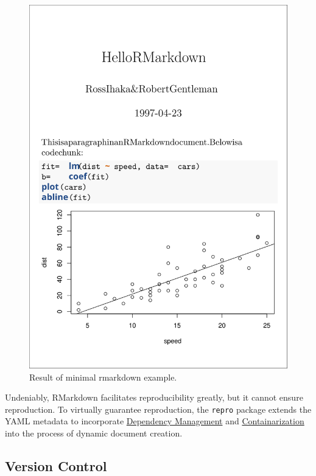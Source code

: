 \documentclass[12pt,a4paper,]{article}
\begin{document}
\begin{figure}

{\centering \includegraphics[width=1\linewidth]{images/rmarkdown} 

}

\caption{Result of minimal rmarkdown example.}\label{fig:rmarkdown}
\end{figure}

Undeniably, RMarkdown facilitates reproducibility greatly, but it cannot ensure reproduction. To virtually guarantee reproduction, the \texttt{repro} package extends the YAML metadata to incorporate \protect\hyperlink{dependency-management}{Dependency Management} and \protect\hyperlink{containarization}{Containarization} into the process of dynamic document creation.

\hypertarget{version-control}{%
\subsection{Version Control}\label{version-control}}
\end{document}
